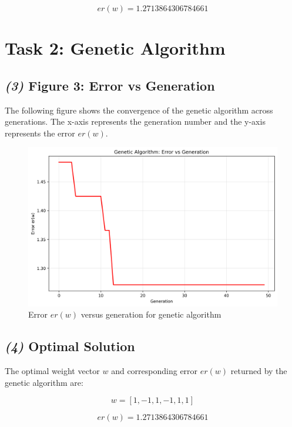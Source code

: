 \documentclass[11pt]{article}
\begin{document}
\begin{equation}
\label{eq:er_local}
er(w) = 1.2713864306784661
\end{equation}

\newpage

\section*{Task 2: Genetic Algorithm}

\subsection*{\textit{(3)} Figure 3: Error vs Generation}

The following figure shows the convergence of the genetic algorithm across generations. The x-axis represents the generation number and the y-axis represents the error $er(w)$.

\begin{figure}[h!]
    \centering
    \includegraphics[width=0.75\linewidth]{../../genetic_algorithm_error.png}
    \caption{Error $er(w)$ versus generation for genetic algorithm}
    \label{fig:genetic}
\end{figure}

\subsection*{\textit{(4)} Optimal Solution}

The optimal weight vector $w$ and corresponding error $er(w)$ returned by the genetic algorithm are:

\setcounter{equation}{7}
\begin{equation}
\label{eq:w_genetic}
w = [1, -1, 1, -1, 1, 1]
\end{equation}

\begin{equation}
\label{eq:er_genetic}
er(w) = 1.2713864306784661
\end{equation}
\end{document}
